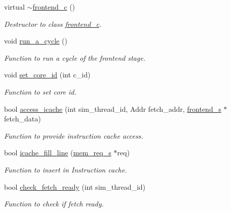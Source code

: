\begin{DoxyCompactItemize}
\item 
virtual \hyperlink{classfrontend__c_abdcd8c40abb51367726d148b2c36ba49}{$\sim$frontend\_\-c} ()
\begin{DoxyCompactList}\small\item\em Destructor to class \hyperlink{classfrontend__c}{frontend\_\-c}. \item\end{DoxyCompactList}\item 
void \hyperlink{classfrontend__c_afd414e828f5a18c6172459f8f4ba87ff}{run\_\-a\_\-cycle} ()
\begin{DoxyCompactList}\small\item\em Function to run a cycle of the frontend stage. \item\end{DoxyCompactList}\item 
void \hyperlink{classfrontend__c_aba122a1a3acd7b872f5fc86a6b56f66d}{set\_\-core\_\-id} (int c\_\-id)
\begin{DoxyCompactList}\small\item\em Function to set core id. \item\end{DoxyCompactList}\item 
bool \hyperlink{classfrontend__c_a22c817f911289521ccd1efe08314e024}{access\_\-icache} (int sim\_\-thread\_\-id, Addr fetch\_\-addr, \hyperlink{structfrontend__s}{frontend\_\-s} $\ast$fetch\_\-data)
\begin{DoxyCompactList}\small\item\em Function to provide instruction cache access. \item\end{DoxyCompactList}\item 
bool \hyperlink{classfrontend__c_abf8dbd5646c42471cd77efa0de6aadae}{icache\_\-fill\_\-line} (\hyperlink{structmem__req__s}{mem\_\-req\_\-s} $\ast$req)
\begin{DoxyCompactList}\small\item\em Function to insert in Instruction cache. \item\end{DoxyCompactList}\item 
bool \hyperlink{classfrontend__c_a8342ffcf0cad38412cccf6a8d4443fc8}{check\_\-fetch\_\-ready} (int sim\_\-thread\_\-id)
\begin{DoxyCompactList}\small\item\em Function to check if fetch ready. \item\end{DoxyCompactList}\item 

\end{DoxyCompactItemize}
